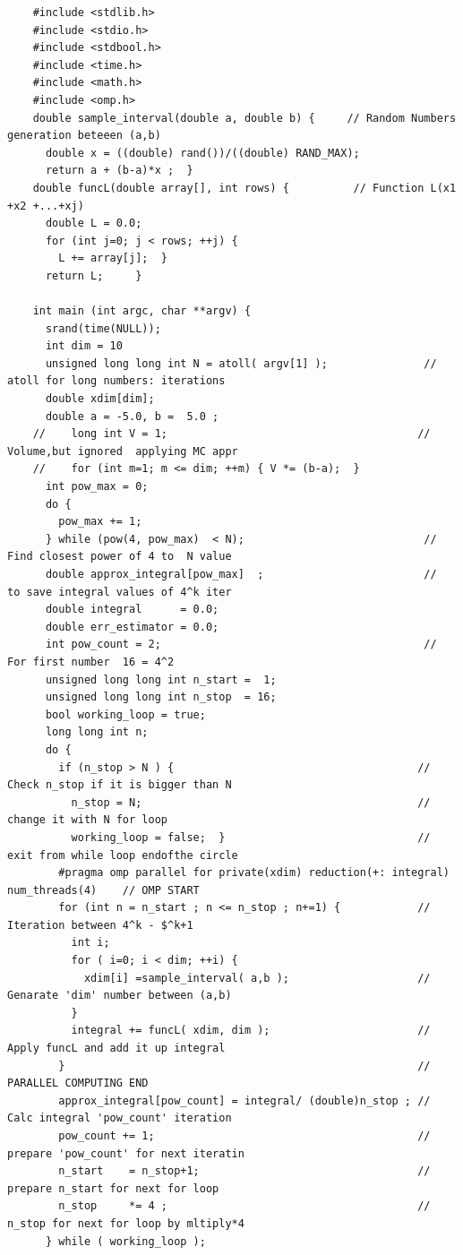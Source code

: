 \documentclass{article}
\begin{document}
\begin{program}
	\begin{verbatim}
	#include <stdlib.h>
	#include <stdio.h>
	#include <stdbool.h>
	#include <time.h>
	#include <math.h>
	#include <omp.h>
	double sample_interval(double a, double b) {     // Random Numbers generation beteeen (a,b)
	  double x = ((double) rand())/((double) RAND_MAX);
	  return a + (b-a)*x ;  }
	double funcL(double array[], int rows) {          // Function L(x1 +x2 +...+xj)
	  double L = 0.0;
	  for (int j=0; j < rows; ++j) {
	    L += array[j];  }
	  return L;  	}

	int main (int argc, char **argv) {
	  srand(time(NULL));
	  int dim = 10
	  unsigned long long int N = atoll( argv[1] );               // atoll for long numbers: iterations
	  double xdim[dim];
	  double a = -5.0, b =  5.0 ;
	//    long int V = 1;                                       // Volume,but ignored  applying MC appr
	//    for (int m=1; m <= dim; ++m) { V *= (b-a);  }
	  int pow_max = 0;
	  do {
	    pow_max += 1;
	  } while (pow(4, pow_max)  < N);                            // Find closest power of 4 to  N value
	  double approx_integral[pow_max]  ;                         //  to save integral values of 4^k iter
	  double integral      = 0.0;
	  double err_estimator = 0.0;
	  int pow_count = 2;                                         // For first number  16 = 4^2
	  unsigned long long int n_start =  1;
	  unsigned long long int n_stop  = 16;
	  bool working_loop = true;
      long long int n;
	  do {
	    if (n_stop > N ) {                                      // Check n_stop if it is bigger than N
	      n_stop = N;                                           // change it with N for loop
	      working_loop = false;  }                              // exit from while loop endofthe circle
	    #pragma omp parallel for private(xdim) reduction(+: integral) num_threads(4)    // OMP START
	    for (int n = n_start ; n <= n_stop ; n+=1) {            // Iteration between 4^k - $^k+1 
	      int i;
	      for ( i=0; i < dim; ++i) {
	        xdim[i] =sample_interval( a,b );                    // Genarate 'dim' number between (a,b)
	      }
	      integral += funcL( xdim, dim );                       // Apply funcL and add it up integral 
	    }                                                       // PARALLEL COMPUTING END
	    approx_integral[pow_count] = integral/ (double)n_stop ; // Calc integral 'pow_count' iteration
	    pow_count += 1;                                         // prepare 'pow_count' for next iteratin
	    n_start    = n_stop+1;                                  // prepare n_start for next for loop
	    n_stop     *= 4 ;                                       // n_stop for next for loop by mltiply*4
	  } while ( working_loop );
	

\end{verbatim}
\end{program}
\end{document}
